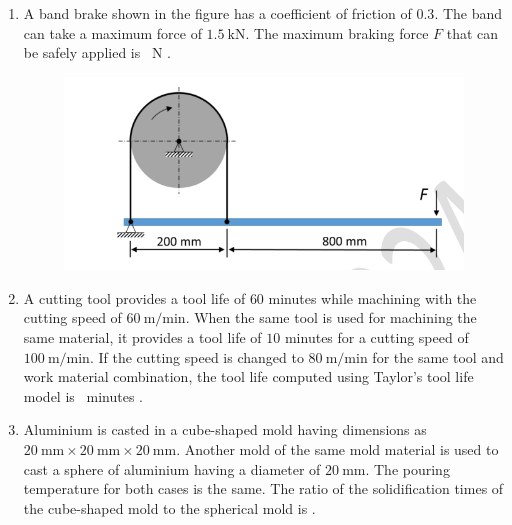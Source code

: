 \documentclass[journal]{IEEEtran}
\begin{document}
\begin{enumerate}[leftmargin=0pt]
\vspace{4mm}

\item
A band brake shown in the figure has a coefficient of friction of $0.3$. The band can take a maximum force of $1.5~\text{kN}$. The maximum braking force $F$ that can be safely applied is \underline{\hspace{2cm}}~N .

\begin{figure}[h]
\includegraphics[width=0.56\columnwidth]{Figs/image (88).png}
\caption*{}
\label{fig:q59}
\end{figure}

\hfill{}

\vspace{4mm}

\item
A cutting tool provides a tool life of $60$ minutes while machining with the cutting speed of $60~\text{m/min}$. When the same tool is used for machining the same material, it provides a tool life of $10$ minutes for a cutting speed of $100~\text{m/min}$. If the cutting speed is changed to $80~\text{m/min}$ for the same tool and work material combination, the tool life computed using Taylor's tool life model is \underline{\hspace{2cm}}~minutes .

\hfill{}

\vspace{4mm}

\item
Aluminium is casted in a cube-shaped mold having dimensions as $20~\text{mm} \times 20~\text{mm} \times 20~\text{mm}$. Another mold of the same mold material is used to cast a sphere of aluminium having a diameter of $20~\text{mm}$. The pouring temperature for both cases is the same. The ratio of the solidification times of the cube-shaped mold to the spherical mold is \underline{\hspace{2cm}} .


\end{enumerate}
\end{document}
